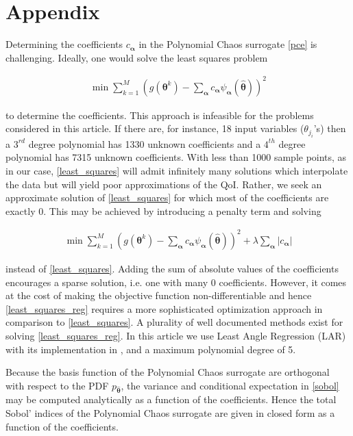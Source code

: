 \section*{Appendix}

Determining the coefficients $c_{\boldsymbol{\alpha}}$ in the Polynomial Chaos surrogate \eqref{pce} is challenging. Ideally, one would solve the least squares problem
\begin{ceqn}
\begin{eqnarray}
\label{least_squares}
\min \sum\limits_{k=1}^M \left(g(\boldsymbol{\theta}^k)-\sum_{\boldsymbol{\alpha}} c_{\boldsymbol{\alpha}} \psi_{\boldsymbol{\alpha}}(\hat{\boldsymbol{\theta}}) \right)^2 \tag{A.1}
\end{eqnarray}
\end{ceqn}
to determine the coefficients. This approach is infeasible for the problems considered in this article. If there are, for instance, 18 input variables ($\theta_{j_i}$'s) then a $3^{rd}$ degree polynomial has 1330 unknown coefficients and a $4^{th}$ degree polynomial has 7315 unknown coefficients. With less than 1000 sample points, as in our case, \eqref{least_squares} will admit infinitely many solutions which interpolate the data but will yield poor approximations of the QoI. Rather, we seek an approximate solution of \eqref{least_squares} for which most of the coefficients are exactly 0. This may be achieved by introducing a penalty term and solving
\begin{ceqn}
\begin{eqnarray}
\label{least_squares_reg}
\min \sum\limits_{k=1}^M \left(g(\boldsymbol{\theta}^k)-\sum_{\boldsymbol{\alpha}} c_{\boldsymbol{\alpha}} \psi_{\boldsymbol{\alpha}}(\hat{\boldsymbol{\theta}}) \right)^2 + \lambda \sum_{\boldsymbol{\alpha}} \vert c_{\boldsymbol{\alpha}} \vert \tag{A.2}
\end{eqnarray}
\end{ceqn}
instead of \eqref{least_squares}. Adding the sum of absolute values of the coefficients encourages a sparse solution, i.e. one with many 0 coefficients. However, it comes at the cost of making the objective function non-differentiable and hence \eqref{least_squares_reg} requires a more sophisticated optimization approach in comparison to \eqref{least_squares}. A plurality of well documented methods exist for solving \eqref{least_squares_reg}. In this article we use Least Angle Regression (LAR) \cite{lar} with its implementation in \cite{uqlab}, and a maximum polynomial degree of 5.

Because the basis function of the Polynomial Chaos surrogate are orthogonal with respect to the PDF $p_{\hat{\boldsymbol{\theta}}}$, the variance and conditional expectation in \eqref{sobol} may be computed analytically as a function of the coefficients. Hence the total Sobol' indices of the Polynomial Chaos surrogate are given in closed form as a function of the coefficients.
